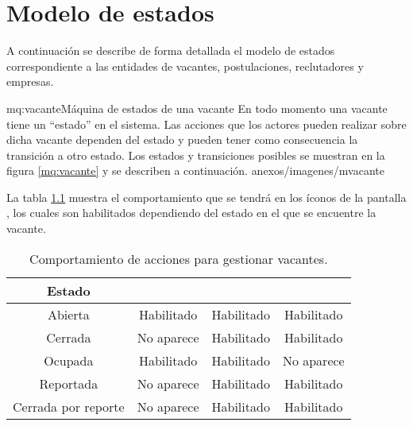 \chapter{Modelo de estados}

A continuación se describe de forma detallada el modelo de estados correspondiente a las entidades de vacantes, postulaciones, reclutadores
y empresas.
\begin{Maquina}{mq:vacante}{Máquina de estados de una vacante}{
	En todo momento una vacante tiene un ``estado'' en el sistema. Las acciones que los actores pueden realizar sobre dicha vacante 
	dependen del estado y pueden tener como consecuencia la transición a otro estado.
	Los estados y transiciones posibles se muestran en la figura \ref{mq:vacante} y se describen a continuación.
}{anexos/imagenes/mvacante}

	La tabla \ref{fig:mqvacante} muestra el comportamiento que se tendrá en los íconos de la pantalla 
	, los cuales son habilitados dependiendo del estado en el que se encuentre  la vacante.

	\begin{table}[htbp]
		\begin{center}
			\begin{tabular}{|c|c|c|c|}
				\hline
				Estado &\IUbutton{Cerrar vacante}& \IUEliminar & \IUEditar \\
				\hline \hline
				Abierta  & Habilitado & Habilitado & Habilitado \\ \hline
				Cerrada & No aparece & Habilitado & Habilitado \\ \hline
				Ocupada & Habilitado & Habilitado & No aparece \\ \hline
				Reportada & No aparece & Habilitado & Habilitado \\ \hline
				Cerrada por reporte & No aparece & Habilitado & Habilitado\\ \hline
			\end{tabular}
			\caption{Comportamiento de acciones para gestionar vacantes.} 
			\label{fig:mqvacante}

		\end{center}
	\end{table}
\end{Maquina}

